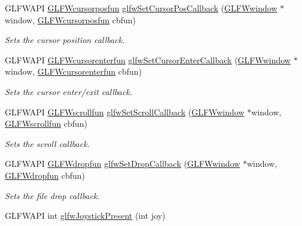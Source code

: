 \begin{DoxyCompactItemize}
G\+L\+F\+W\+A\+PI \hyperlink{group__input_ga4cfad918fa836f09541e7b9acd36686c}{G\+L\+F\+Wcursorposfun} \hyperlink{group__input_ga9c49c0d3d3c775c3124726f1d902124d}{glfw\+Set\+Cursor\+Pos\+Callback} (\hyperlink{group__window_ga3c96d80d363e67d13a41b5d1821f3242}{G\+L\+F\+Wwindow} $\ast$window, \hyperlink{group__input_ga4cfad918fa836f09541e7b9acd36686c}{G\+L\+F\+Wcursorposfun} cbfun)
\begin{DoxyCompactList}\small\item\em Sets the cursor position callback. \end{DoxyCompactList}\item 
G\+L\+F\+W\+A\+PI \hyperlink{group__input_ga51ab436c41eeaed6db5a0c9403b1c840}{G\+L\+F\+Wcursorenterfun} \hyperlink{group__input_gaa20014985561efeb2c53f1956f727830}{glfw\+Set\+Cursor\+Enter\+Callback} (\hyperlink{group__window_ga3c96d80d363e67d13a41b5d1821f3242}{G\+L\+F\+Wwindow} $\ast$window, \hyperlink{group__input_ga51ab436c41eeaed6db5a0c9403b1c840}{G\+L\+F\+Wcursorenterfun} cbfun)
\begin{DoxyCompactList}\small\item\em Sets the cursor enter/exit callback. \end{DoxyCompactList}\item 
G\+L\+F\+W\+A\+PI \hyperlink{group__input_ga4687e2199c60a18a8dd1da532e6d75c9}{G\+L\+F\+Wscrollfun} \hyperlink{group__input_ga29011514e93368712a3063a28707ced3}{glfw\+Set\+Scroll\+Callback} (\hyperlink{group__window_ga3c96d80d363e67d13a41b5d1821f3242}{G\+L\+F\+Wwindow} $\ast$window, \hyperlink{group__input_ga4687e2199c60a18a8dd1da532e6d75c9}{G\+L\+F\+Wscrollfun} cbfun)
\begin{DoxyCompactList}\small\item\em Sets the scroll callback. \end{DoxyCompactList}\item 
G\+L\+F\+W\+A\+PI \hyperlink{group__input_gab71f4ca80b651462852e601caf308c4a}{G\+L\+F\+Wdropfun} \hyperlink{group__input_gad4fc40df63a5d0441ab06de9a585cc04}{glfw\+Set\+Drop\+Callback} (\hyperlink{group__window_ga3c96d80d363e67d13a41b5d1821f3242}{G\+L\+F\+Wwindow} $\ast$window, \hyperlink{group__input_gab71f4ca80b651462852e601caf308c4a}{G\+L\+F\+Wdropfun} cbfun)
\begin{DoxyCompactList}\small\item\em Sets the file drop callback. \end{DoxyCompactList}\item 
G\+L\+F\+W\+A\+PI int \hyperlink{group__input_ga7f81f22f355f4b7d315caf73cdfd9906}{glfw\+Joystick\+Present} (int joy)

\end{DoxyCompactItemize}
